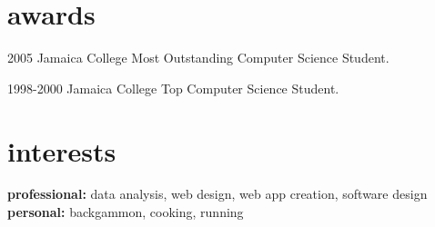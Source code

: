 \documentclass[]{friggeri-cv} %
\begin{document}
\section{awards}

\begin{entrylist}
\entry
{2005}
{Jamaica College}
{}
{Most Outstanding Computer Science Student.}

\entry
{1998-2000}
{Jamaica College}
{}
{Top Computer Science Student.}
\end{entrylist}


\section{interests}

\textbf{professional:} data analysis, web design, web app creation, software design \\ 
\textbf{personal:} backgammon, cooking, running

\end{document}
